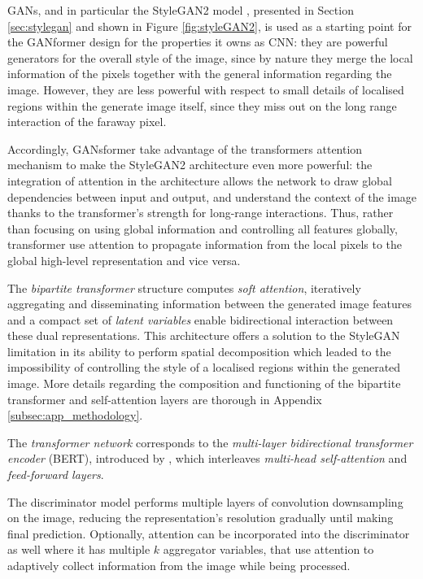\documentclass{article}
\begin{document}
	GANs, and in particular the StyleGAN2 model \cite{karras2020analyzing}, presented in Section 
	\ref{sec:stylegan} and shown in Figure \ref{fig:styleGAN2}, is used as a starting point for the 
	GANformer design for the properties it owns as CNN: they are powerful generators for the overall 
	style of the image, since by nature they merge the local information of the pixels together with the 
	general information regarding the image. 
	However, they are less powerful with respect to small details of localised regions within the 
	generate 
	image itself, since they miss out on the long range interaction of the faraway pixel.
	
	Accordingly, GANsformer take advantage of the transformers attention mechanism to make the 
	StyleGAN2 architecture even more powerful: the integration of attention in the architecture allows 
	the network to draw global dependencies between input and output, and understand the context of 
	the image thanks to the transformer's strength for long-range interactions.
	Thus, rather than focusing on using global information and controlling all features globally, 
	transformer use attention to propagate information from the local pixels to the global high-level 
	representation and vice versa. 
	
	The \textit{bipartite transformer} structure computes \textit{soft attention}, iteratively aggregating 
	and disseminating information between the generated image features and a compact set of 
	\textit{latent variables} enable bidirectional interaction between these dual representations. 
	This architecture offers a solution to the StyleGAN limitation in its ability to perform spatial 
	decomposition which leaded to the impossibility of controlling the style of a localised regions 
	within the generated image.
	More details regarding the composition and functioning of the bipartite transformer and 
	self-attention layers are thorough in Appendix \ref{subsec:app_methodology}. 
	
	The \textit{transformer network} corresponds to the \textit{multi-layer bidirectional transformer 
	encoder} (BERT), introduced by \citet{devlin2019bert}, which interleaves \textit{multi-head 
	self-attention} and \textit{feed-forward layers}. 

	The discriminator model performs multiple layers of convolution downsampling on the image, 
	reducing the representation's resolution gradually until making final prediction. 
	Optionally, attention can be incorporated into the discriminator as well where it has multiple $k$ 
	aggregator variables, that use attention to adaptively collect information from the image while being 
	processed. 
	
\end{document}
